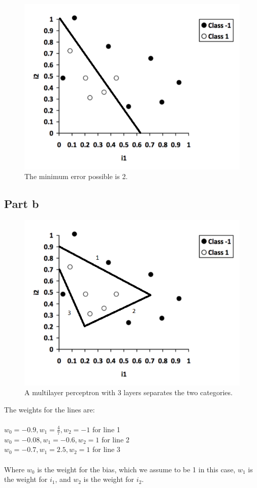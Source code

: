 \documentclass[12pt]{article}
\begin{document}
\begin{figure}[H]
    \centering
    \includegraphics[width=1\textwidth]{question_5_plot_a}
    \caption{The minimum error possible is 2.}
    \label{fig:question_5_plot_a}
\end{figure}

\subsection*{Part b}

\begin{figure}[H]
    \centering
    \includegraphics[width=1\textwidth]{question_5_plot_b}
    \caption{A multilayer perceptron with 3 layers separates the two categories.}
    \label{fig:question_5_plot_b}
\end{figure}

The weights for the lines are:
\\
\\
$w_0 = -0.9, w_1 = \frac{4}{7}, w_2 = -1$ for line 1 
\\
$w_0 = -0.08, w_1 = -0.6, w_2 = 1$ for line 2
\\
$w_0 = -0.7, w_1 = 2.5, w_2 = 1$ for line 3
\\
\\
Where $w_0$ is the weight for the bias, which we assume to be 1 in this case, $w_1$ is the weight for $i_1$, and $w_2$ is the weight for $i_2$.
\end{document}
